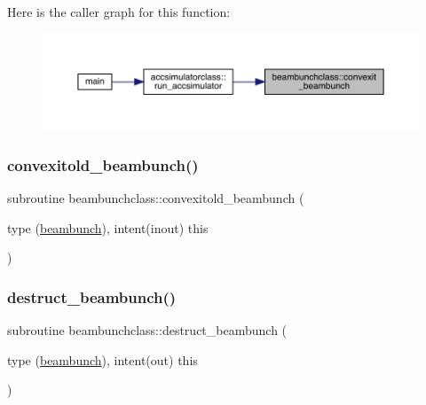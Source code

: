 Here is the caller graph for this function\+:\nopagebreak
\begin{figure}[H]
\begin{center}
\leavevmode
\includegraphics[width=350pt]{namespacebeambunchclass_a4126361c8be17915e9c6c24697801f47_icgraph}
\end{center}
\end{figure}
\mbox{\label{namespacebeambunchclass_a53657fc9705a5a612bc5775c121c314e}} 
\subsubsection{\texorpdfstring{convexitold\_beambunch()}{convexitold\_beambunch()}}
{\footnotesize\ttfamily subroutine beambunchclass\+::convexitold\+\_\+beambunch (\begin{DoxyParamCaption}\item[{type (\mbox{\hyperlink{namespacebeambunchclass_structbeambunchclass_1_1beambunch}{beambunch}}), intent(inout)}]{this }\end{DoxyParamCaption})}

\mbox{\label{namespacebeambunchclass_a0fe1e4d236f209b18f75b272bf07782d}} 
\subsubsection{\texorpdfstring{destruct\_beambunch()}{destruct\_beambunch()}}
{\footnotesize\ttfamily subroutine beambunchclass\+::destruct\+\_\+beambunch (\begin{DoxyParamCaption}\item[{type (\mbox{\hyperlink{namespacebeambunchclass_structbeambunchclass_1_1beambunch}{beambunch}}), intent(out)}]{this }\end{DoxyParamCaption})}

